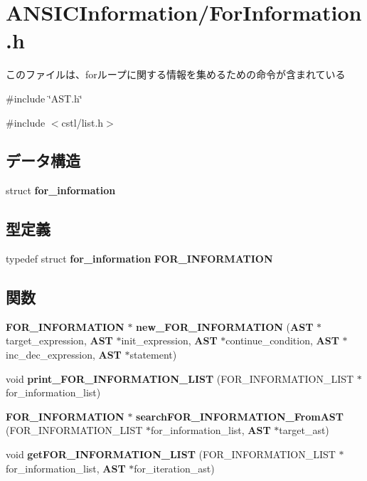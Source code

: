 \section{ANSICInformation/ForInformation.h}
\label{ForInformation_8h}


このファイルは、forループに関する情報を集めるための命令が含まれている  


{\ttfamily \#include \char`\"{}AST.h\char`\"{}}\par
{\ttfamily \#include $<$cstl/list.h$>$}\par
\subsection*{データ構造}
\begin{DoxyCompactItemize}
\item 
struct {\bf for\_\-information}
\end{DoxyCompactItemize}
\subsection*{型定義}
\begin{DoxyCompactItemize}
\item 
typedef struct {\bf for\_\-information} {\bf FOR\_\-INFORMATION}
\end{DoxyCompactItemize}
\subsection*{関数}
\begin{DoxyCompactItemize}
\item 
{\bf FOR\_\-INFORMATION} $\ast$ {\bf new\_\-FOR\_\-INFORMATION} ({\bf AST} $\ast$target\_\-expression, {\bf AST} $\ast$init\_\-expression, {\bf AST} $\ast$continue\_\-condition, {\bf AST} $\ast$inc\_\-dec\_\-expression, {\bf AST} $\ast$statement)
\item 
void {\bf print\_\-FOR\_\-INFORMATION\_\-LIST} (FOR\_\-INFORMATION\_\-LIST $\ast$for\_\-information\_\-list)
\item 
{\bf FOR\_\-INFORMATION} $\ast$ {\bf searchFOR\_\-INFORMATION\_\-FromAST} (FOR\_\-INFORMATION\_\-LIST $\ast$for\_\-information\_\-list, {\bf AST} $\ast$target\_\-ast)
\item 
void {\bf getFOR\_\-INFORMATION\_\-LIST} (FOR\_\-INFORMATION\_\-LIST $\ast$for\_\-information\_\-list, {\bf AST} $\ast$for\_\-iteration\_\-ast)
\end{DoxyCompactItemize}


